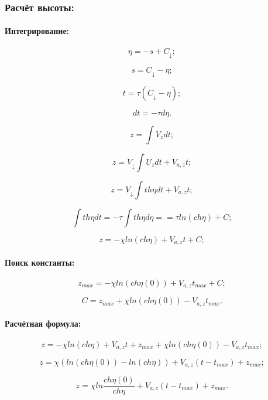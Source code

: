 \subsubsection{Расчёт высоты:}

\paragraph{Интегрирование:}

$$\eta = -s + C_\downarrow;$$

$$s= C_\downarrow-\eta;$$

$$t = \tau \left ( C_\downarrow-\eta \right );$$

$$dt = - \tau d\eta.$$

$$z = \int V_z dt;$$

$$z = V_\downarrow \int U_z dt + V_{a,z}t;$$

$$z = V_\downarrow \int th \eta dt + V_{a,z}t;$$

$$\int th \eta dt = -\tau \int th \eta d\eta = =\tau ln \left ( ch \eta \right ) + C;$$

$$z = - \chi ln \left ( ch \eta \right ) + V_{a,z}t + C;$$

\paragraph{Поиск константы:}

$$z_{max} = -\chi ln \left ( ch \eta(0) \right ) + V_{a,z}t_{max} + C;$$

$$C = z_{max} + \chi ln \left ( ch \eta(0) \right ) - V_{a,z}t_{max}.$$

\paragraph{Расчётная формула:}

$$z = - \chi ln \left ( ch \eta \right ) + V_{a,z}t + z_{max} + \chi ln \left ( ch \eta(0) \right ) - V_{a,z}t_{max};$$

$$z = \chi \left ( ln \left ( ch \eta(0) \right ) - ln \left ( ch \eta \right ) \right ) + V_{a,z}(t - t_{max}) + z_{max};$$

$$\boxed{
z = \chi ln \frac{ch \eta(0)}{ch \eta} + V_{a,z}(t - t_{max}) + z_{max}.
}$$